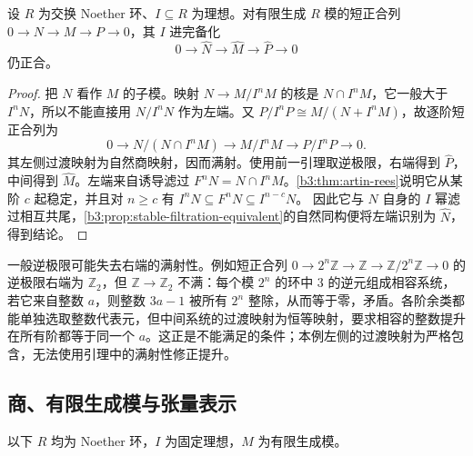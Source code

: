 \begin{theorem}\label{b3:thm:completion-exact}
	设 \(R\) 为交换 Noether 环、\(I\subseteq R\) 为理想。对有限生成 \(R\) 模的短正合列 \(0\rightarrow N\rightarrow M\rightarrow P\rightarrow0\)，其 \(I\) 进完备化
	\[
		0\longrightarrow\widehat N\longrightarrow\widehat M \longrightarrow\widehat P\longrightarrow0
	\]
	仍正合。
\end{theorem}
\begin{proof}
	把 \(N\) 看作 \(M\) 的子模。映射 \(N\to M/I^nM\) 的核是 \(N\cap I^nM\)，它一般大于 \(I^nN\)，所以不能直接用 \(N/I^nN\) 作为左端。又 \(P/I^nP\cong M/(N+I^nM)\)，故逐阶短正合列为
	\[
		0\longrightarrow N/(N\cap I^nM)\longrightarrow M/I^nM \longrightarrow P/I^nP\longrightarrow0.
	\]
	其左侧过渡映射为自然商映射，因而满射。使用前一引理取逆极限，右端得到 \(\widehat P\)，中间得到 \(\widehat M\)。左端来自诱导滤过 \(F^nN=N\cap I^nM\)。\cref{b3:thm:artin-rees}说明它从某阶 \(c\) 起稳定，并且对 \(n\ge c\) 有 \(I^nN\subseteq F^nN\subseteq I^{n-c}N\)。 因此它与 \(N\) 自身的 \(I\) 幂滤过相互共尾，\cref{b3:prop:stable-filtration-equivalent}的自然同构便将左端识别为 \(\widehat N\)，得到结论。
\end{proof}

一般逆极限可能失去右端的满射性。例如短正合列 \(0\rightarrow2^n\mathbb Z\rightarrow\mathbb Z\rightarrow\mathbb Z/2^n\mathbb Z\rightarrow0\) 的逆极限右端为 \(\mathbb Z_2\)，但 \(\mathbb Z\rightarrow\mathbb Z_2\) 不满：每个模 \(2^n\) 的环中 \(3\) 的逆元组成相容系统，若它来自整数 \(a\)，则整数 \(3a-1\) 被所有 \(2^n\) 整除，从而等于零，矛盾。各阶余类都能单独选取整数代表元，但中间系统的过渡映射为恒等映射，要求相容的整数提升在所有阶都等于同一个 \(a\)。这正是不能满足的条件；本例左侧的过渡映射为严格包含，无法使用引理中的满射性修正提升。

\subsection{商、有限生成模与张量表示}
\label{b3:subsec:1303:04}

以下 \(R\) 均为 Noether 环，\(I\) 为固定理想，\(M\) 为有限生成模。

